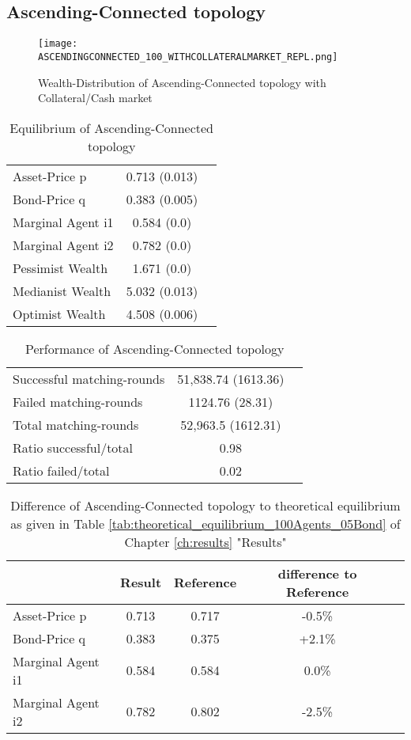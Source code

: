 \documentclass[Bachelorarbeit.tex]{subfiles}
\begin{document}
\subsection{Ascending-Connected topology}
\begin{figure}[H]
	\centering
  \texttt{[image: ASCENDINGCONNECTED\_100\_WITHCOLLATERALMARKET\_REPL.png]}
	\caption{Wealth-Distribution of Ascending-Connected topology with Collateral/Cash market}
	\label{fig:wealth_ASCENDINGCONNECTED_100_WITHCOLLATERALMARKET_REPL}
\end{figure}

\begin{table}[H]
	\caption{Equilibrium of Ascending-Connected topology}
	\centering
	\begin{tabular} { l c r }
		\hline
		Asset-Price p & 0.713 (0.013) \\
		Bond-Price q & 0.383 (0.005) \\
		Marginal Agent i1 & 0.584 (0.0) \\
		Marginal Agent i2 & 0.782 (0.0) \\
		\hline
		Pessimist Wealth & 1.671 (0.0) \\
		Medianist Wealth & 5.032 (0.013) \\
		Optimist Wealth & 4.508 (0.006) \\
		\hline
	\end{tabular}
\end{table} 

\begin{table}[H]
	\caption{Performance of Ascending-Connected topology}
	\centering
	\begin{tabular} { l c r }
		\hline
		Successful matching-rounds & 51,838.74 (1613.36) \\
		Failed matching-rounds & 1124.76 (28.31) \\
		Total matching-rounds & 52,963.5 (1612.31) \\
		\hline
		Ratio successful/total & 0.98 \\
		Ratio failed/total & 0.02 \\
		\hline
	\end{tabular}
\end{table}

\begin{table}[H]
	\caption{Difference of Ascending-Connected topology to theoretical equilibrium as given in Table \ref{tab:theoretical_equilibrium_100Agents_05Bond} of Chapter \ref{ch:results} "Results"}
	\centering
	\begin{tabular} { l c c c r }
		& Result & Reference & difference to Reference \\
		\hline
		Asset-Price p & 0.713 & 0.717 & -0.5\% \\
		Bond-Price q & 0.383 & 0.375 & +2.1\% \\
		Marginal Agent i1 & 0.584 & 0.584 & 0.0\% \\
		Marginal Agent i2 & 0.782 & 0.802 & -2.5\% \\
		\hline
	\end{tabular}
\end{table} 
\end{document}
